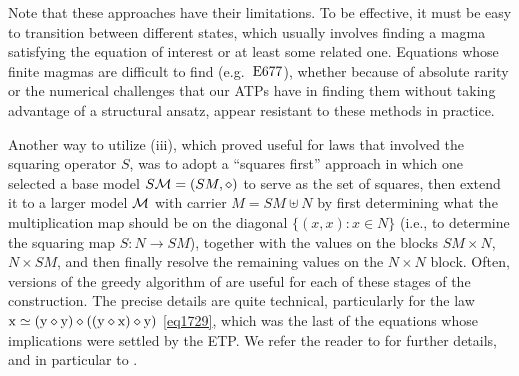 Note that these approaches have their limitations.  To be effective, it must be easy to transition between different
states, which usually involves finding a magma satisfying the equation of interest or at least some related one.
Equations whose finite magmas are difficult to find (e.g.\ $\mathrm{E}677$), whether because of absolute rarity or the numerical challenges
that our ATPs have in finding them without taking advantage of a structural ansatz, appear resistant to these methods in practice.

Another way to utilize (iii), which proved useful for laws that involved the squaring operator $S$, was to adopt a ``squares first'' approach in which one selected a base model $S{\mathcal{M}} = (SM,\diamond)$ to serve as the set of squares, then extend it to a larger model ${\mathcal{M}}$ with carrier $M = SM \uplus N$ by first determining what the multiplication map should be on the diagonal $\{ (x,x): x\in N\}$ (i.e., to determine the squaring map $S \colon N \to SM$), together with the values on the blocks $SM \times N$, $N \times SM$, and then finally resolve the remaining values on the $N \times N$ block.  Often, versions of the greedy algorithm of  are useful for each of these stages of the construction.  The precise details are quite technical, particularly for the law $\mathrm{x} \simeq (\mathrm{y} \diamond \mathrm{y}) \diamond ((\mathrm{y} \diamond \mathrm{x}) \diamond \mathrm{y})$ \eqref{eq1729}, which was the last of the equations whose implications were settled by the ETP.  We refer the reader to \cite[Chapter~18]{ETP_blueprint} for further details, and in particular to \cite[Theorem~18.1]{ETP_blueprint}.

